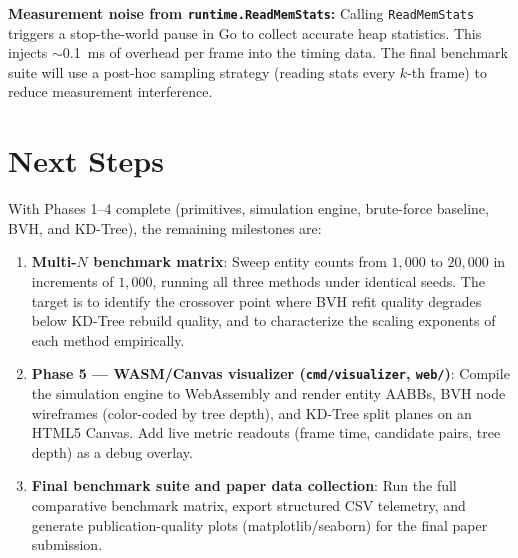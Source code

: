 \documentclass[12pt]{article}
\begin{document}
\textbf{Measurement noise from \texttt{runtime.ReadMemStats}:} Calling \texttt{ReadMemStats} triggers a stop-the-world pause in Go to collect accurate heap statistics. This injects $\sim$0.1~ms of overhead per frame into the timing data. The final benchmark suite will use a post-hoc sampling strategy (reading stats every $k$-th frame) to reduce measurement interference.

\section{Next Steps}

With Phases 1--4 complete (primitives, simulation engine, brute-force baseline, BVH, and KD-Tree), the remaining milestones are:

\begin{enumerate}
    \item \textbf{Multi-$N$ benchmark matrix}:
    Sweep entity counts from $1{,}000$ to $20{,}000$ in increments of $1{,}000$, running all three methods under identical seeds. The target is to identify the crossover point where BVH refit quality degrades below KD-Tree rebuild quality, and to characterize the scaling exponents of each method empirically.

    \item \textbf{Phase 5 --- WASM/Canvas visualizer (\texttt{cmd/visualizer}, \texttt{web/})}:
    Compile the simulation engine to WebAssembly and render entity AABBs, BVH node wireframes (color-coded by tree depth), and KD-Tree split planes on an HTML5 Canvas. Add live metric readouts (frame time, candidate pairs, tree depth) as a debug overlay.

    \item \textbf{Final benchmark suite and paper data collection}:
    Run the full comparative benchmark matrix, export structured CSV telemetry, and generate publication-quality plots (matplotlib/seaborn) for the final paper submission.
\end{enumerate}
\end{document}
